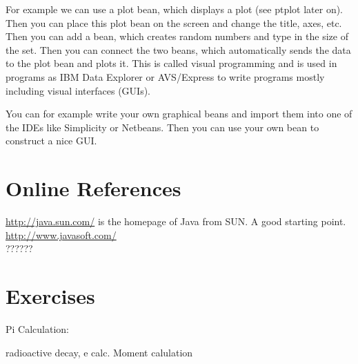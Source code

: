 For example we can use a plot bean, which displays a plot (see
ptplot later on). Then you can place this plot bean on the screen
and change the title, axes, etc. Then you can add a bean, which
creates random numbers and type in the size of the set. Then
you can connect the two beans, which automatically sends the
data to the plot bean and plots it. This is called visual 
programming and is used in programs as IBM Data Explorer or
AVS/Express to write programs mostly including visual 
interfaces (GUIs).

You can for example write your own graphical beans and import them 
into one of the IDEs like Simplicity or Netbeans. Then you can 
use your own bean to construct a nice GUI.


\section{Online References}
\label{sec:OnlineReferences}

\href{http://java.sun.com/}{http://java.sun.com/} is the homepage of
Java from SUN. A good starting point. \\

\href{http://www.javasoft.com/}{http://www.javasoft.com/} \\

??????


\section{Exercises}
Pi Calculation:



radioactive decay, e calc.
Moment calulation


\nocite{FLANAGAN-EXAMPLES}
\nocite{GOSLING}





